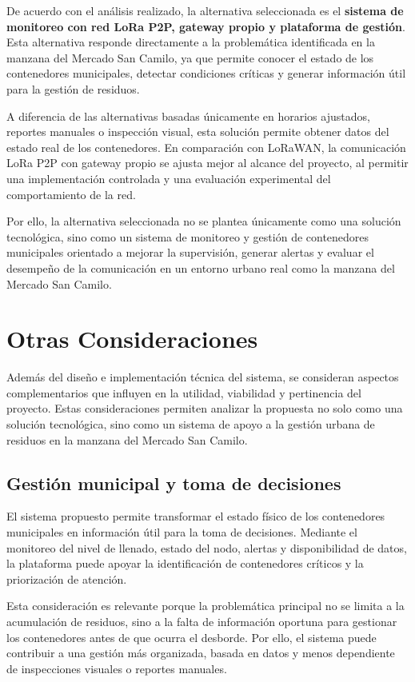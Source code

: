 De acuerdo con el análisis realizado, la alternativa seleccionada es el \textbf{sistema de monitoreo con red LoRa P2P, gateway propio y plataforma de gestión}. Esta alternativa responde directamente a la problemática identificada en la manzana del Mercado San Camilo, ya que permite conocer el estado de los contenedores municipales, detectar condiciones críticas y generar información útil para la gestión de residuos.

A diferencia de las alternativas basadas únicamente en horarios ajustados, reportes manuales o inspección visual, esta solución permite obtener datos del estado real de los contenedores. En comparación con LoRaWAN, la comunicación LoRa P2P con gateway propio se ajusta mejor al alcance del proyecto, al permitir una implementación controlada y una evaluación experimental del comportamiento de la red.

Por ello, la alternativa seleccionada no se plantea únicamente como una solución tecnológica, sino como un sistema de monitoreo y gestión de contenedores municipales orientado a mejorar la supervisión, generar alertas y evaluar el desempeño de la comunicación en un entorno urbano real como la manzana del Mercado San Camilo.

\section{Otras Consideraciones}

Además del diseño e implementación técnica del sistema, se consideran aspectos complementarios que influyen en la utilidad, viabilidad y pertinencia del proyecto. Estas consideraciones permiten analizar la propuesta no solo como una solución tecnológica, sino como un sistema de apoyo a la gestión urbana de residuos en la manzana del Mercado San Camilo.

\subsection{Gestión municipal y toma de decisiones}

El sistema propuesto permite transformar el estado físico de los contenedores municipales en información útil para la toma de decisiones. Mediante el monitoreo del nivel de llenado, estado del nodo, alertas y disponibilidad de datos, la plataforma puede apoyar la identificación de contenedores críticos y la priorización de atención.

Esta consideración es relevante porque la problemática principal no se limita a la acumulación de residuos, sino a la falta de información oportuna para gestionar los contenedores antes de que ocurra el desborde. Por ello, el sistema puede contribuir a una gestión más organizada, basada en datos y menos dependiente de inspecciones visuales o reportes manuales.

